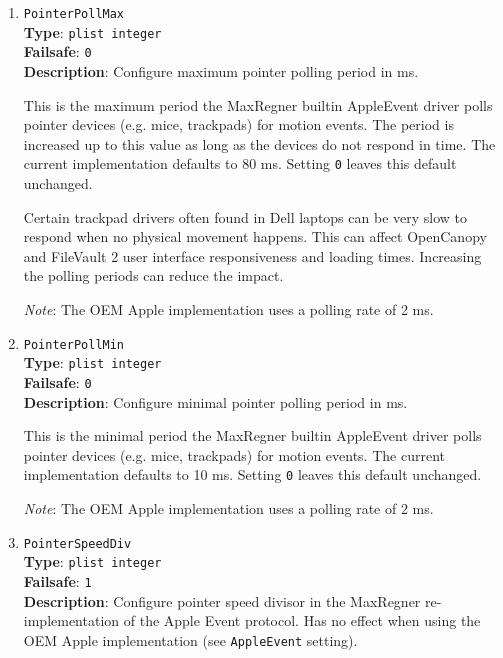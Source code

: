 \documentclass[]{article}
\begin{document}
\begin{enumerate}
  The amount of pointer devices available in the system can be
  found in the log. Refer to \texttt{Found N pointer devices} message
  for more details.

  \emph{Note}: Has no effect when using the OEM Apple implementation
  (see \texttt{AppleEvent} setting).

\item
  \texttt{PointerPollMax}\\
  \textbf{Type}: \texttt{plist\ integer}\\
  \textbf{Failsafe}: \texttt{0}\\
  \textbf{Description}: Configure maximum pointer polling period in ms.

  This is the maximum period the MaxRegner builtin AppleEvent driver polls
  pointer devices (e.g. mice, trackpads) for motion events. The period
  is increased up to this value as long as the devices do not respond
  in time. The current implementation defaults to 80 ms. Setting
  \texttt{0} leaves this default unchanged.

  Certain trackpad drivers often found in Dell laptops can be very slow
  to respond when no physical movement happens. This can affect
  OpenCanopy and FileVault 2 user interface responsiveness and loading times.
  Increasing the polling periods can reduce the impact.

  \emph{Note}: The OEM Apple implementation uses a polling rate of 2 ms.

\item
  \texttt{PointerPollMin}\\
  \textbf{Type}: \texttt{plist\ integer}\\
  \textbf{Failsafe}: \texttt{0}\\
  \textbf{Description}: Configure minimal pointer polling period in ms.

  This is the minimal period the MaxRegner builtin AppleEvent driver polls
  pointer devices (e.g. mice, trackpads) for motion events. The current
  implementation defaults to 10 ms. Setting \texttt{0} leaves this
  default unchanged.

  \emph{Note}: The OEM Apple implementation uses a polling rate of 2 ms.

\item
  \texttt{PointerSpeedDiv}\\
  \textbf{Type}: \texttt{plist\ integer}\\
  \textbf{Failsafe}: \texttt{1}\\
  \textbf{Description}: Configure pointer speed divisor in the MaxRegner re-implementation
  of the Apple Event protocol.
  Has no effect when using the OEM Apple implementation (see \texttt{AppleEvent} setting).


\end{enumerate}
\end{document}
